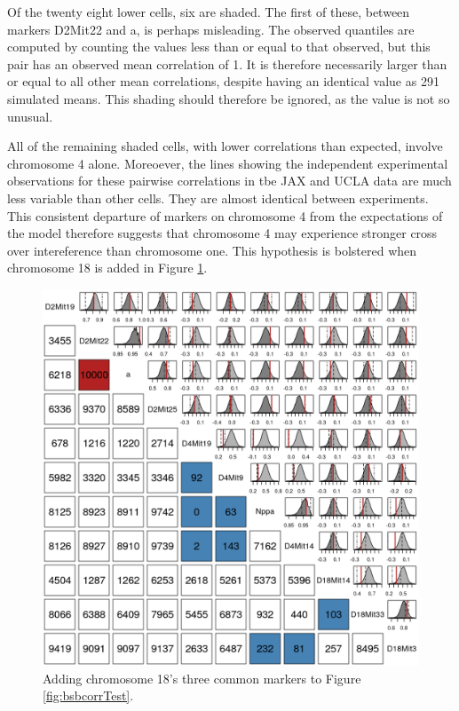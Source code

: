 \documentclass[sts]{imsart}
\begin{document}
Of the twenty eight lower cells, six are shaded. The first of these, between markers D2Mit22 and a, is perhaps misleading. The observed quantiles are computed by counting the values less than or equal to that observed, but this pair has an observed mean correlation of 1. It is therefore necessarily larger than or equal to all other mean correlations, despite having an identical value as 291 simulated means. This shading should therefore be ignored, as the value is not so unusual.

All of the remaining shaded cells, with lower correlations than expected, involve chromosome 4 alone. Moreoever, the lines showing the independent experimental observations for these pairwise correlations in tbe JAX and UCLA data are much less variable than other cells. They are almost identical between experiments. This consistent departure of markers on chromosome 4 from the expectations of the model therefore suggests that chromosome 4 may experience stronger cross over intereference than chromosome one. This hypothesis is bolstered when chromosome 18 is added in Figure \ref{fig:bsbcorrTestBig}.

\begin{figure}[htp]
  \begin{center}
      \includegraphics[scale = 0.5]{../img/bsbCorrTestBig.png}
  \end{center}
  \caption{Adding chromosome 18's three common markers to Figure \ref{fig:bsbcorrTest}.}
  \label{fig:bsbcorrTestBig}
\end{figure}
\end{document}
